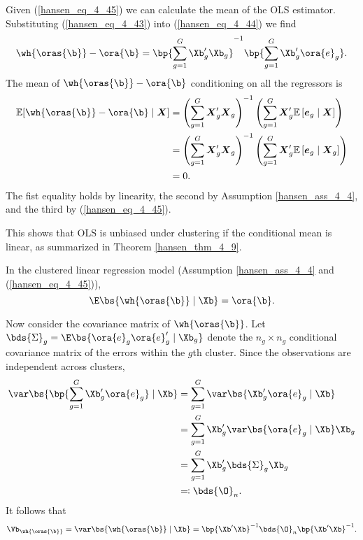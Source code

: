 Given (\ref{hansen_eq_4_45}) we can calculate the mean of the OLS estimator. Substituting (\ref{hansen_eq_4_43}) into (\ref{hansen_eq_4_44}) we find 
\begin{equation}
    \notag 
    \wh{\oras{\b}} - \ora{\b} = \bp{\sum_{g=1}^{G} \Xb_{g}^\prime\Xb_{g}}^{-1} \bp{\sum_{g=1}^{G} \Xb_g^\prime \ora{e}_g}.
\end{equation}
The mean of $\wh{\oras{\b}} - \ora{\b}$ conditioning on all the regressors is 
\begin{equation}
    \notag 
    \begin{aligned}
    \mathbb{E}[\wh{\oras{\b}} - \ora{\b} \mid \boldsymbol{X}] & =\left(\sum_{g=1}^G \boldsymbol{X}_g^{\prime} \boldsymbol{X}_g\right)^{-1}\left(\sum_{g=1}^G \boldsymbol{X}_g^{\prime} \mathbb{E}\left[\boldsymbol{e}_g \mid \boldsymbol{X}\right]\right) \\
    & =\left(\sum_{g=1}^G \boldsymbol{X}_g^{\prime} \boldsymbol{X}_g\right)^{-1}\left(\sum_{g=1}^G \boldsymbol{X}_g^{\prime} \mathbb{E}\left[\boldsymbol{e}_g \mid \boldsymbol{X}_g\right]\right) \\
    & =0 .
    \end{aligned}
\end{equation}
The fist equality holds by linearity, the second by Assumption \ref{hansen_ass_4_4}, and the third by (\ref{hansen_eq_4_45}).

This shows that OLS is unbiased under clustering if the conditional mean is linear, as summarized in Theorem \ref{hansen_thm_4_9}.
\begin{theorem}
    \label{hansen_thm_4_9}
    In the clustered linear regression model (Assumption \ref{hansen_ass_4_4} and (\ref{hansen_eq_4_45})), $$\E\bs{\wh{\oras{\b}} \mid \Xb} = \ora{\b}.$$
\end{theorem}



Now consider the covariance matrix of $\wh{\oras{\b}}$. Let $\bds{\Sigma}_g = \E\bs{\ora{e}_g \ora{e}_g^\prime \mid \Xb_g}$ denote the $n_g \times n_g$ conditional covariance matrix of the errors within the $g$th cluster. Since the observations are independent across clusters,
\begin{equation}
    \label{hansen_eq_4_46}
    \begin{aligned}
        \var\bs{\bp{\sum_{g=1}^{G} \Xb_g^\prime \ora{e}_g} \mid \Xb} & = \sum_{g=1}^{G} \var\bs{\Xb_g^\prime \ora{e}_g \mid \Xb} \\ 
        & = \sum_{g=1}^{G} \Xb_g^\prime \var\bs{\ora{e}_g \mid \Xb} \Xb_g \\
        & = \sum_{g=1}^{G} \Xb_g^\prime \bds{\Sigma}_g \Xb_g \\
        & \eqqcolon \bds{\O}_n.
    \end{aligned}
\end{equation}
It follows that 
\begin{equation}
    \label{hansen_eq_4_47}
    \Vb_{\wh{\oras{\b}}} = \var\bs{\wh{\oras{\b}} \mid \Xb} = \bp{\Xb^\prime \Xb}^{-1} \bds{\O}_n \bp{\Xb^\prime \Xb}^{-1}.
\end{equation}

